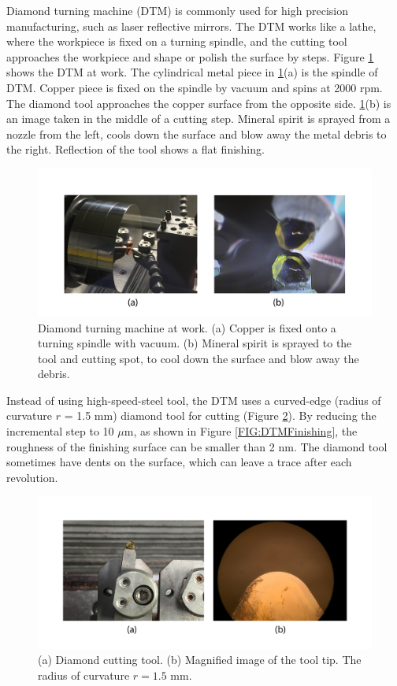 \documentclass[pdflatex, sectionletters, 12pt]{pittetd}    %
\begin{document}
Diamond turning machine (DTM) is commonly used for high precision manufacturing, such as laser reflective mirrors. The DTM works like a lathe, where the workpiece is fixed on a turning spindle, and the cutting tool approaches the workpiece and shape or polish the surface by steps. Figure \ref{FIG:DTM} shows the DTM at work. The cylindrical metal piece in \ref{FIG:DTM}(a) is the spindle of DTM. Copper piece is fixed on the spindle by vacuum and spins at 2000 rpm. The diamond tool approaches the copper surface from the opposite side.  \ref{FIG:DTM}(b) is an image taken in the middle of a cutting step. Mineral spirit is sprayed from a nozzle from the left, cools down the surface and blow away the metal debris to the right. Reflection of the tool shows a flat finishing.

\begin{figure}[h!]
	\centering
	\includegraphics[width=1.0\textwidth]{Drawing/DTM.pdf}
	\caption{Diamond turning machine at work. (a) Copper is fixed onto a turning spindle with vacuum. (b) Mineral spirit is sprayed to the tool and cutting spot, to cool down the surface and blow away the debris.}
	\label{FIG:DTM}
\end{figure}

Instead of using high-speed-steel tool, the DTM uses a curved-edge (radius of curvature $r$ = 1.5 mm) diamond tool for cutting (Figure \ref{FIG:DiamondTool}). By reducing the incremental step to 10 $\mu$m, as shown in Figure \ref{FIG:DTMFinishing}, the roughness of the finishing surface can be smaller than 2 nm. The diamond tool sometimes have dents on the surface, which can leave a trace after each revolution.

\begin{figure}[h!]
	\centering
	\includegraphics[width=1.0\textwidth]{Drawing/DiamondTool.pdf}
	\caption{(a) Diamond cutting tool. (b) Magnified image of the tool tip. The radius of curvature $r = 1.5$ mm.}
	\label{FIG:DiamondTool}
\end{figure}
\end{document}
